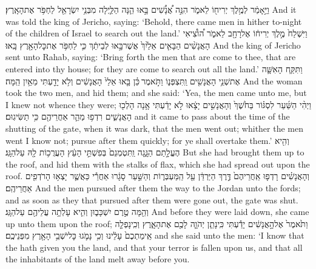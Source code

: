 {וַיֵּ֣אָמַ֔ר לְמֶ֥לֶךְ יְרִיח֖וֹ לֵאמֹ֑ר הִנֵּ֣ה אֲ֠נָשִׁ֠ים בָּ֣אוּ הֵ֧נָּה הַלַּ֛יְלָה מִבְּנֵ֥י יִשְׂרָאֵ֖ל לַחְפֹּ֥ר אֶת\maqqaf הָאָֽרֶץ׃}
{And it was told the king of Jericho, saying: ‘Behold, there came men in hither to-night of the children of Israel to search out the land.’}
{וַיִּשְׁלַח֙ מֶ֣לֶךְ יְרִיח֔וֹ אֶל\maqqaf רָחָ֖ב לֵאמֹ֑ר ה֠וֹצִ֠יאִי הָאֲנָשִׁ֨ים הַבָּאִ֤ים אֵלַ֙יִךְ֙ אֲשֶׁר\maqqaf בָּ֣אוּ לְבֵיתֵ֔ךְ כִּ֛י לַחְפֹּ֥ר אֶת\maqqaf כׇּל\maqqaf הָאָ֖רֶץ בָּֽאוּ׃}
{And the king of Jericho sent unto Rahab, saying: ‘Bring forth the men that are come to thee, that are entered into thy house; for they are come to search out all the land.’}
{וַתִּקַּ֧ח הָאִשָּׁ֛ה אֶת\maqqaf שְׁנֵ֥י הָאֲנָשִׁ֖ים וַֽתִּצְפְּנ֑וֹ וַתֹּ֣אמֶר \legarmeh  כֵּ֗ן בָּ֤אוּ אֵלַי֙ הָאֲנָשִׁ֔ים וְלֹ֥א יָדַ֖עְתִּי מֵאַ֥יִן הֵֽמָּה׃}
{And the woman took the two men, and hid them; and she said: ‘Yea, the men came unto me, but I knew not whence they were;}
{וַיְהִ֨י הַשַּׁ֜עַר לִסְגּ֗וֹר בַּחֹ֙שֶׁךְ֙ וְהָאֲנָשִׁ֣ים יָצָ֔אוּ לֹ֣א יָדַ֔עְתִּי אָ֥נָה הָלְכ֖וּ הָאֲנָשִׁ֑ים רִדְפ֥וּ מַהֵ֛ר אַחֲרֵיהֶ֖ם כִּ֥י תַשִּׂיגֽוּם׃}
{and it came to pass about the time of the shutting of the gate, when it was dark, that the men went out; whither the men went I know not; pursue after them quickly; for ye shall overtake them.’}
{וְהִ֖יא הֶעֱלָ֣תַם הַגָּ֑גָה וַֽתִּטְמְנֵם֙ בְּפִשְׁתֵּ֣י הָעֵ֔ץ הָעֲרֻכ֥וֹת לָ֖הּ עַל\maqqaf הַגָּֽג׃}
{But she had brought them up to the roof, and hid them with the stalks of flax, which she had spread out upon the roof.}
{וְהָאֲנָשִׁ֗ים רָדְפ֤וּ אַֽחֲרֵיהֶם֙ דֶּ֣רֶךְ הַיַּרְדֵּ֔ן עַ֖ל הַֽמַּעְבְּר֑וֹת וְהַשַּׁ֣עַר סָגָ֔רוּ אַחֲרֵ֕י כַּאֲשֶׁ֛ר יָצְא֥וּ הָרֹדְפִ֖ים אַחֲרֵיהֶֽם׃}
{And the men pursued after them the way to the Jordan unto the fords; and as soon as they that pursued after them were gone out, the gate was shut.}
{וְהֵ֖מָּה טֶ֣רֶם יִשְׁכָּב֑וּן וְהִ֛יא עָלְתָ֥ה עֲלֵיהֶ֖ם עַל\maqqaf הַגָּֽג׃}
{And before they were laid down, she came up unto them upon the roof;}
{וַתֹּ֙אמֶר֙ אֶל\maqqaf הָ֣אֲנָשִׁ֔ים יָדַ֕עְתִּי כִּֽי\maqqaf נָתַ֧ן יְהֹוָ֛ה לָכֶ֖ם אֶת\maqqaf הָאָ֑רֶץ וְכִֽי\maqqaf נָפְלָ֤ה אֵֽימַתְכֶם֙ עָלֵ֔ינוּ וְכִ֥י נָמֹ֛גוּ כׇּל\maqqaf יֹשְׁבֵ֥י הָאָ֖רֶץ מִפְּנֵיכֶֽם׃}
{and she said unto the men: ‘I know that the \lord\space hath given you the land, and that your terror is fallen upon us, and that all the inhabitants of the land melt away before you.}
